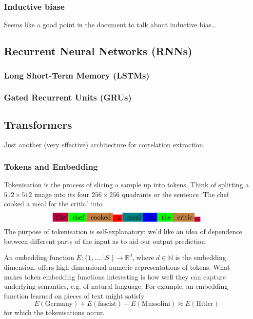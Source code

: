 \documentclass[11pt]{article}
\begin{document}
\subsubsection{Inductive biase}
Seems like a good point in the document to talk about inductive bias\dots

\subsection{\TODO{: }Recurrent Neural Networks (RNNs)}

\subsubsection{Long Short-Term Memory (LSTMs)}

\subsubsection{Gated Recurrent Units (GRUs)}

\subsection{\TODO{: }Transformers}
Just another (very effective) architecture for correlation extraction.

\subsubsection{Tokens and Embedding}
Tokenisation is the process of slicing a sample up into tokens. Think of splitting a $512\times512$ image into its four $256\times256$ quadrants or the sentence `The chef cooked a meal for the critic.' into
$$
\colorbox{purple}{The}\colorbox{green}{ chef}\colorbox{brown}{ cooked}\colorbox{red}{ a}\colorbox{teal}{ meal}\colorbox{blue}{ for}\colorbox{green}{ the}\colorbox{brown}{ critic}\colorbox{purple}{.}
$$
The purpose of tokenisation is self-explanatory: we'd like an idea of dependence between different parts of the input as to aid our output prediction.

An embedding function $E:\{1,\dots,|S|\}\to\mathbb{R}^d$, where $d\in\mathbb{N}$ is the embedding dimension, offers high dimensional numeric representations of tokens. What makes token embedding functions interesting is how well they can capture underlying semantics, e.g. of natural language. For example, an embedding function learned on pieces of text might satisfy
$$
E(\text{Germany})+E(\text{fascist})-E(\text{Mussolini})
\approx
E(\text{Hitler})
$$
for which the tokenisations occur.
\end{document}
